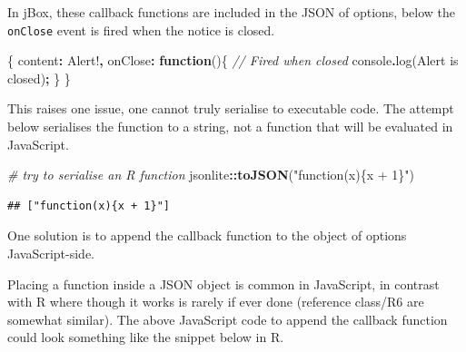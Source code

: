 \documentclass[
]{krantz}
\makeatletter
\newenvironment{Shaded}{\begin{snugshade}}{\end{snugshade}}
\newcommand{\BuiltInTok}[1]{#1}
\newcommand{\CommentTok}[1]{\textcolor[rgb]{0.37,0.37,0.37}{\textit{#1}}}
\newcommand{\DataTypeTok}[1]{\textcolor[rgb]{0.27,0.27,0.27}{#1}}
\newcommand{\FunctionTok}[1]{\textcolor[rgb]{0,0,0}{#1}}
\newcommand{\KeywordTok}[1]{\textcolor[rgb]{0.27,0.27,0.27}{\textbf{#1}}}
\newcommand{\NormalTok}[1]{#1}
\newcommand{\OperatorTok}[1]{\textcolor[rgb]{0.43,0.43,0.43}{\textbf{#1}}}
\newcommand{\StringTok}[1]{\textcolor[rgb]{0.5,0.5,0.5}{#1}}
\newenvironment{kframe}{%
\medskip{}
\setlength{\fboxsep}{.8em}
 \def\at@end@of@kframe{}%
 \ifinner\ifhmode%
  \def\at@end@of@kframe{\end{minipage}}%
  \begin{minipage}{\columnwidth}%
 \fi\fi%
 \def\FrameCommand##1{\hskip\@totalleftmargin \hskip-\fboxsep
 \colorbox{shadecolor}{##1}\hskip-\fboxsep
     \hskip-\linewidth \hskip-\@totalleftmargin \hskip\columnwidth}%
 \MakeFramed {\advance\hsize-\width
   \@totalleftmargin\z@ \linewidth\hsize
   \@setminipage}}%
 {\par\unskip\endMakeFramed%
 \at@end@of@kframe}
\renewenvironment{Shaded}{\begin{kframe}}{\end{kframe}}
\makeatother
\begin{document}
In jBox, these callback functions are included in the JSON of options, below the \texttt{onClose} event is fired when the notice is closed.

\begin{Shaded}
\begin{Highlighting}[]
\NormalTok{\{}
  \DataTypeTok{content}\OperatorTok{:} \StringTok{\textquotesingle{}Alert!\textquotesingle{}}\OperatorTok{,}
  \DataTypeTok{onClose}\OperatorTok{:} \KeywordTok{function}\NormalTok{()\{}
    \CommentTok{// Fired when closed }
    \BuiltInTok{console}\OperatorTok{.}\FunctionTok{log}\NormalTok{(}\StringTok{\textquotesingle{}Alert is closed\textquotesingle{}}\NormalTok{)}\OperatorTok{;}
\NormalTok{  \}}
\NormalTok{\}}
\end{Highlighting}
\end{Shaded}

This raises one issue, one cannot truly serialise to executable code. The attempt below serialises the function to a string, not a function that will be evaluated in JavaScript.

\begin{Shaded}
\begin{Highlighting}[]
\CommentTok{\# try to serialise an R function}
\NormalTok{jsonlite}\OperatorTok{::}\KeywordTok{toJSON}\NormalTok{(}\StringTok{"function(x)\{x + 1\}"}\NormalTok{)}
\end{Highlighting}
\end{Shaded}

\begin{verbatim}
## ["function(x){x + 1}"]
\end{verbatim}

One solution is to append the callback function to the object of options JavaScript-side.

\begin{Shaded}
\end{Shaded}

Placing a function inside a JSON object is common in JavaScript, in contrast with R where though it works is rarely if ever done (reference class/R6 are somewhat similar). The above JavaScript code to append the callback function could look something like the snippet below in R.
\end{document}
